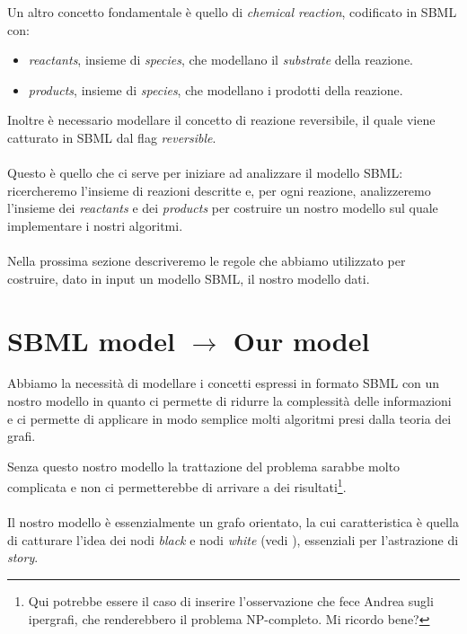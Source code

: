 Un altro concetto fondamentale \`e quello di \emph{chemical reaction},
codificato in SBML con:
\begin{itemize}
\item \emph{reactants}, insieme di \emph{species}, che modellano il
  \emph{substrate} della reazione.
\item \emph{products}, insieme di \emph{species}, che modellano i
  prodotti della reazione.
\end{itemize}
Inoltre \`e necessario modellare il concetto di reazione
reversibile, il quale viene catturato in SBML dal flag
\emph{reversible}.
\\\\
Questo \`e quello che ci serve per iniziare ad analizzare il modello
SBML: ricercheremo l'insieme di reazioni descritte e, per ogni
reazione, analizzeremo l'insieme dei \emph{reactants} e dei
\emph{products} per costruire un nostro modello sul quale implementare
i nostri algoritmi.
\\\\
Nella prossima sezione descriveremo le regole che abbiamo utilizzato
per costruire, dato in input un modello SBML, il nostro modello
dati.

\section{SBML model $\rightarrow$ Our model}

Abbiamo la necessit\`a di modellare i concetti espressi in formato
SBML con un nostro modello in quanto ci permette di ridurre la
complessit\`a delle informazioni e ci permette di applicare in modo
semplice molti algoritmi presi dalla teoria dei grafi.

Senza questo nostro modello la trattazione del problema sarabbe molto
complicata e non ci permetterebbe di arrivare a dei
risultati\footnote{Qui potrebbe essere il caso di inserire
  l'osservazione che fece Andrea sugli ipergrafi, che renderebbero il
  problema NP-completo. Mi ricordo bene?}.
\\\\
Il nostro modello \`e essenzialmente un grafo orientato, la cui
caratteristica \`e quella di catturare l'idea dei nodi \emph{black} e
nodi \emph{white} (vedi \cite{tellingStories}), essenziali per
l'astrazione di \emph{story}.

